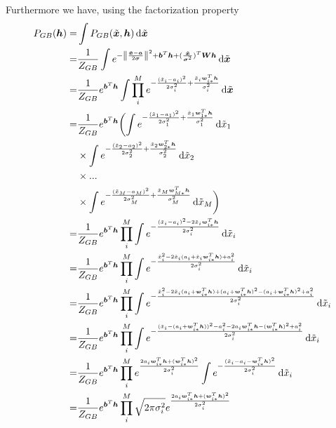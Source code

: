 \documentclass[twoside,english]{uiofysmaster}
\newcommand*\dif{\mathop{}\!\mathrm{d}}
\DeclarePairedDelimiter{\norm}{\lVert}{\rVert}
\begin{document}
Furthermore we have, using the factorization property
\begin{align}
	P_{GB} (\bm{h}) =& \int P_{GB} (\tilde{\bm{x}}, \bm{h}) \dif \tilde{\bm{x}} \nonumber \\
	=& \frac{1}{Z_{GB}} \int e^{-\norm*{\frac{\tilde{\bm{x}} -\bm{a}}{2\bm{\sigma}}}^2 + \bm{b}^T \bm{h} 
	+ (\frac{\tilde{\bm{x}}}{\bm{\sigma}^2})^T \bm{W}\bm{h}} \dif \tilde{\bm{x}} \nonumber \\
	=& \frac{1}{Z_{GB}} e^{\bm{b}^T \bm{h} } \int \prod_i^M
	e^{- \frac{(\tilde{x}_i - a_i)^2}{2\sigma_i^2} + \frac{\tilde{x}_i \bm{w}_{i\ast}^T \bm{h}}{\sigma_i^2} } \dif \tilde{\bm{x}} \nonumber \\
	=& \frac{1}{Z_{GB}} e^{\bm{b}^T \bm{h} }
	\biggl( \int e^{- \frac{(\tilde{x}_1 - a_1)^2}{2\sigma_1^2} + \frac{\tilde{x}_1 \bm{w}_{1\ast}^T \bm{h}}{\sigma_1^2} } \dif \tilde{x}_1 \nonumber \\
	& \times \int e^{- \frac{(\tilde{x}_2 - a_2)^2}{2\sigma_2^2} + \frac{\tilde{x}_2 \bm{w}_{2\ast}^T \bm{h}}{\sigma_2^2} } \dif \tilde{x}_2 \nonumber \\
	& \times ... \nonumber \\
	&\times \int e^{- \frac{(\tilde{x}_M - a_M)^2}{2\sigma_M^2} + \frac{\tilde{x}_M \bm{w}_{M\ast}^T \bm{h}}{\sigma_M^2} } \dif \tilde{x}_M \biggr) \nonumber \\
	=& \frac{1}{Z_{GB}} e^{\bm{b}^T \bm{h}} \prod_i^M
	\int e^{- \frac{(\tilde{x}_i - a_i)^2 - 2\tilde{x}_i \bm{w}_{i\ast}^T \bm{h}}{2\sigma_i^2} } \dif \tilde{x}_i \nonumber \\
	=& \frac{1}{Z_{GB}} e^{\bm{b}^T \bm{h}} \prod_i^M
	\int e^{- \frac{\tilde{x}_i^2 - 2\tilde{x}_i(a_i + \tilde{x}_i \bm{w}_{i\ast}^T \bm{h}) + a_i^2}{2\sigma_i^2} } \dif \tilde{x}_i \nonumber \\
	=& \frac{1}{Z_{GB}} e^{\bm{b}^T \bm{h}} \prod_i^M
	\int e^{- \frac{\tilde{x}_i^2 - 2\tilde{x}_i(a_i + \bm{w}_{i\ast}^T \bm{h}) + (a_i + \bm{w}_{i\ast}^T \bm{h})^2 - (a_i + \bm{w}_{i\ast}^T \bm{h})^2 + a_i^2}{2\sigma_i^2} } \dif \tilde{x}_i \nonumber \\
	=& \frac{1}{Z_{GB}} e^{\bm{b}^T \bm{h}} \prod_i^M
	\int e^{- \frac{(\tilde{x}_i - (a_i + \bm{w}_{i\ast}^T \bm{h}))^2 - a_i^2 -2a_i \bm{w}_{i\ast}^T \bm{h} - (\bm{w}_{i\ast}^T \bm{h})^2 + a_i^2}{2\sigma_i^2} } \dif \tilde{x}_i \nonumber \\
	=& \frac{1}{Z_{GB}} e^{\bm{b}^T \bm{h}} \prod_i^M
	e^{\frac{2a_i \bm{w}_{i\ast}^T \bm{h} +(\bm{w}_{i\ast}^T \bm{h})^2 }{2\sigma_i^2}}
	\int e^{- \frac{(\tilde{x}_i - a_i - \bm{w}_{i\ast}^T \bm{h})^2}{2\sigma_i^2}}
	\dif \tilde{x}_i \nonumber \\
	=& \frac{1}{Z_{GB}} e^{\bm{b}^T \bm{h}} \prod_i^M
	\sqrt{2\pi \sigma_i^2}
	e^{\frac{2a_i \bm{w}_{i\ast}^T \bm{h} +(\bm{w}_{i\ast}^T \bm{h})^2 }{2\sigma_i^2}}
	\nonumber \\
\end{align}
\end{document}
